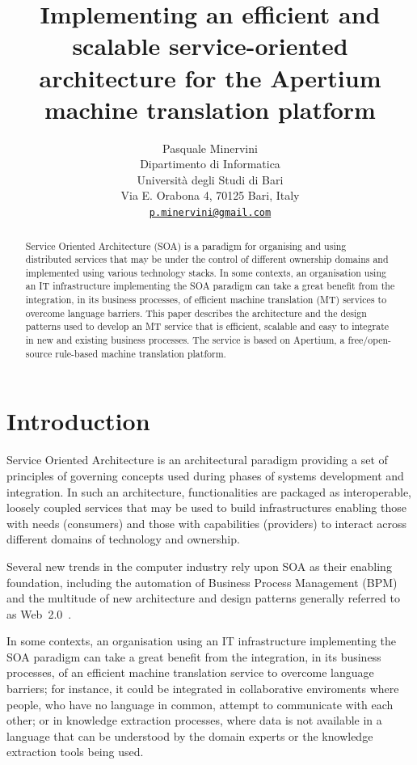 \documentclass[11pt]{article}
\title{Implementing an efficient and scalable service-oriented architecture for the Apertium machine translation platform}
\author{Pasquale Minervini\\
  Dipartimento di Informatica\\
  Università degli Studi di Bari\\
  Via E. Orabona 4, 70125 Bari, Italy\\
  \href{mailto:p.minervini@gmail.com}{\nolinkurl{p.minervini@gmail.com}}}
\date{}
\begin{document}
\maketitle

\begin{abstract}
Service Oriented Architecture (SOA) is a paradigm for organising and using distributed services that may be under the control of different ownership domains and implemented using various technology stacks. In some contexts, an organisation using an IT infrastructure implementing the SOA paradigm can take a great benefit from the integration, in its business processes, of efficient machine translation (MT) services to overcome language barriers. This paper describes the architecture and the design patterns used to develop an MT service that is efficient, scalable and easy to integrate in new and existing business processes. The service is based on Apertium, a free/open-source rule-based machine translation platform.
\end{abstract}


\section{Introduction}

Service Oriented Architecture is an architectural paradigm providing a set of principles of governing concepts used during phases of systems development and integration. In such an architecture, functionalities are packaged as interoperable, loosely coupled services that may be used to build infrastructures enabling those with needs (consumers) and those with capabilities (providers) to interact across different domains of technology and ownership.

Several new trends in the computer industry rely upon SOA as their enabling foundation, including the automation of Business Process Management (BPM) and the multitude of new architecture and design patterns generally referred to as Web~2.0~\citep{web20}.

In some contexts, an organisation using an IT infrastructure implementing the SOA paradigm can take a great benefit from the integration, in its business processes, of an efficient machine translation service to overcome language barriers; for instance, it could be integrated in collaborative enviroments where people, who have no language in common, attempt to communicate with each other; or in knowledge extraction processes, where data is not available in a language that can be understood by the domain experts or the knowledge extraction tools being used.
\end{document}
